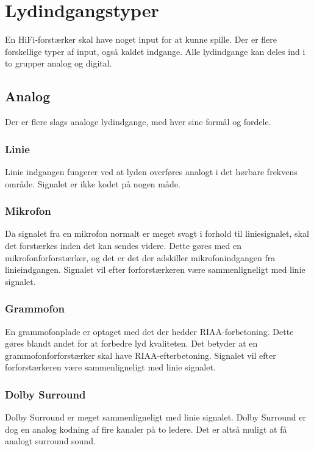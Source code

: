 \section{Lydindgangstyper}
\label{indgange}
En HiFi-forstærker skal have noget input for at kunne spille. Der er flere forskellige typer af input, også kaldet indgange. Alle lydindgange kan deles ind i to grupper analog og digital.

\subsection{Analog}
Der er flere slags analoge lydindgange, med hver sine formål og fordele.

\subsubsection{Linie}
Linie indgangen fungerer ved at lyden overføres analogt i det hørbare frekvens område. Signalet er ikke kodet på nogen måde. 

\subsubsection{Mikrofon}
Da signalet fra en mikrofon normalt er meget svagt i forhold til liniesignalet, skal det forstærkes inden det kan sendes videre. Dette gøres med en mikrofonforforstærker, og det er det der adskiller mikrofonindgangen fra linieindgangen. Signalet vil efter forforstærkeren være sammenligneligt med linie signalet.

\subsubsection{Grammofon}
En grammofonplade er optaget med det der hedder RIAA-forbetoning. Dette gøres blandt andet for at forbedre lyd kvaliteten. Det betyder at en grammofonforforstærker skal have RIAA-efterbetoning. Signalet vil efter forforstærkeren være sammenligneligt med linie signalet. 

\subsubsection{Dolby Surround}
Dolby Surround er meget sammenligneligt med linie signalet. Dolby Surround er dog en analog kodning af fire kanaler på to ledere. Det er altså muligt at få analogt surround sound. 

